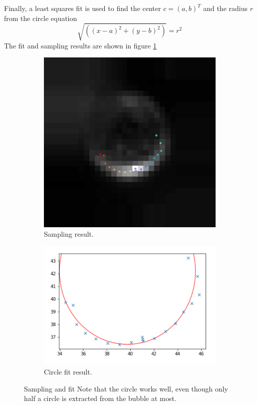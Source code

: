 				
				Finally, a least squares fit is used to find the center $c = (a,b)^T$ and the radius $r$ from the circle equation
				\begin{equation}
					\sqrt{ \left( (x-a)^2 + (y-b)^2 \right)} = r^2
				\end{equation}
				The fit and sampling results are shown in figure \ref{fig:fit_circle_fit_result}
				
				\begin{figure}
				
					\begin{subfigure}[t]{.50\textwidth}
						\centering
						\includegraphics[scale=.8]{images/sampling_result.png}
						\caption{Sampling result. }
					\end{subfigure}					
					\begin{subfigure}[t]{.55\textwidth}
						\centering
						\includegraphics[scale=.7]{graphs/circle_fit.png}
						\caption{Circle fit result.}
					\end{subfigure}
					
					
					\caption{Sampling and fit Note that the circle works well, even though only half a circle is extracted from the bubble at most. }
					\label{fig:fit_circle_fit_result}
				\end{figure}



